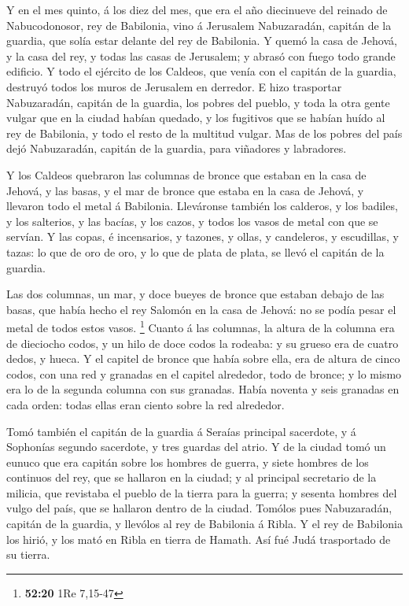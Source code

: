  Y en el mes quinto, á los diez del mes, que era el año
diecinueve del reinado de Nabucodonosor, rey de Babilonia, vino á
Jerusalem Nabuzaradán, capitán de la guardia, que solía estar delante
del rey de Babilonia.  Y quemó la casa de Jehová, y la
casa del rey, y todas las casas de Jerusalem; y abrasó con fuego todo
grande edificio.  Y todo el ejército de los Caldeos, que
venía con el capitán de la guardia, destruyó todos los muros de
Jerusalem en derredor.  E hizo trasportar Nabuzaradán,
capitán de la guardia, los pobres del pueblo, y toda la otra gente
vulgar que en la ciudad habían quedado, y los fugitivos que se habían
huído al rey de Babilonia, y todo el resto de la multitud vulgar.
 Mas de los pobres del país dejó Nabuzaradán, capitán de
la guardia, para viñadores y labradores.

 Y los Caldeos quebraron las columnas de bronce que
estaban en la casa de Jehová, y las basas, y el mar de bronce que estaba
en la casa de Jehová, y llevaron todo el metal á Babilonia.
 Lleváronse también los calderos, y los badiles, y los
salterios, y las bacías, y los cazos, y todos los vasos de metal con que
se servían.  Y las copas, é incensarios, y tazones, y
ollas, y candeleros, y escudillas, y tazas: lo que de oro de oro, y lo
que de plata de plata, se llevó el capitán de la guardia.

 Las dos columnas, un mar, y doce bueyes de bronce que
estaban debajo de las basas, que había hecho el rey Salomón en la casa
de Jehová: no se podía pesar el metal de todos estos vasos. \footnote{\textbf{52:20}
  1Re 7,15-47}  Cuanto á las columnas, la altura de la
columna era de dieciocho codos, y un hilo de doce codos la rodeaba: y su
grueso era de cuatro dedos, y hueca.  Y el capitel de
bronce que había sobre ella, era de altura de cinco codos, con una red y
granadas en el capitel alrededor, todo de bronce; y lo mismo era lo de
la segunda columna con sus granadas.  Había noventa y
seis granadas en cada orden: todas ellas eran ciento sobre la red
alrededor.

 Tomó también el capitán de la guardia á Seraías
principal sacerdote, y á Sophonías segundo sacerdote, y tres guardas del
atrio.  Y de la ciudad tomó un eunuco que era capitán
sobre los hombres de guerra, y siete hombres de los continuos del rey,
que se hallaron en la ciudad; y al principal secretario de la milicia,
que revistaba el pueblo de la tierra para la guerra; y sesenta hombres
del vulgo del país, que se hallaron dentro de la ciudad. 
Tomólos pues Nabuzaradán, capitán de la guardia, y llevólos al rey de
Babilonia á Ribla.  Y el rey de Babilonia los hirió, y
los mató en Ribla en tierra de Hamath. Así fué Judá trasportado de su
tierra.

